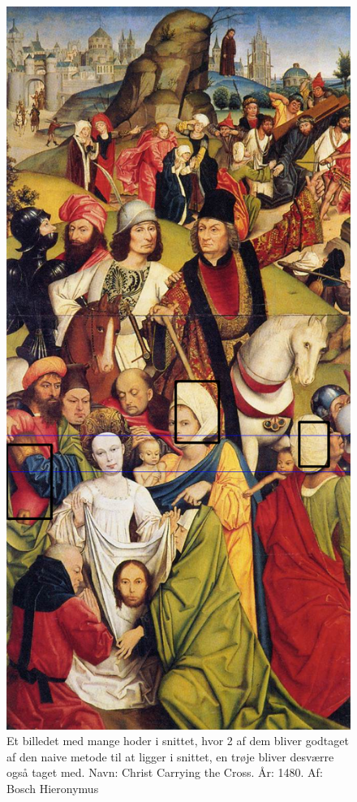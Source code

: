 \begin{figure}[h!!]
	\begin{center}
		\includegraphics[scale=0.3,angle=0]{afsnit/afprovning/billeder/naive_losning/naiv_kfarver_kdetaljer.png}
	\end{center}
	\caption[]{Et billedet med mange hoder i snittet, hvor 2 af dem bliver godtaget af den naive metode til at ligger i snittet, en trøje bliver desværre også taget med. Navn: Christ Carrying the Cross. År: 1480. Af: Bosch Hieronymus}
	\label{naiv_kfarver_kdetaljer}
\end{figure}

